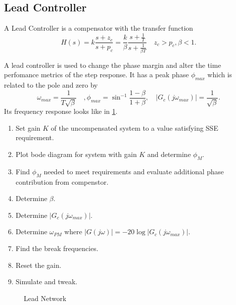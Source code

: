 \subsection{Lead Controller}
\begin{definition}
  A Lead Controller is a compensator with the transfer function
  \[
	H(s) = k\frac{s+z_c}{s+p_c} = \frac{k}{\beta}\frac{s+\frac{1}{T}}{s+\frac{1}{\beta T}} \quad z_c > p_c, \beta < 1.
  \]
  \label{defn:lead-controller}
\end{definition}
A lead controller is used to change the phase margin and alter the time perfomance metrics of the step response. It has a peak phase $\phi_{max}$ which is related to the pole and zero by
\[
  \omega_{max} = \frac{1}{T\sqrt{\beta}}\quad, \phi_{max} = \sin^{-1}\frac{1-\beta}{1+\beta}, \quad |G_c(j\omega_{max})| = \frac{1}{\sqrt{\beta}}.
\]
Its frequency response looks like in \cref{fig:lead-network}.
\begin{enumerate}
  \item Set gain $K$ of the uncompensated system to a value satisfying SSE requirement.
  \item Plot bode diagram for system with gain $K$ and determine $\phi_M$.
  \item Find $\phi_{M}$ needed to meet requirements and evaluate additional phase contribution from compenstor.
  \item Determine $\beta$.
  \item Determine $|G_c(j\omega_{max})|$.
  \item Determine $\omega_{PM}$ where $|G(j\omega)| = -20\log|G_c(j\omega_{max})|$.
  \item Find the break frequencies.
  \item Reset the gain.
  \item Simulate and tweak.
\end{enumerate}
\begin{gitbook-image}
\begin{figure}
  \centering
  \caption{Lead Network}
  \label{fig:lead-network}
\end{figure}
\end{gitbook-image}
